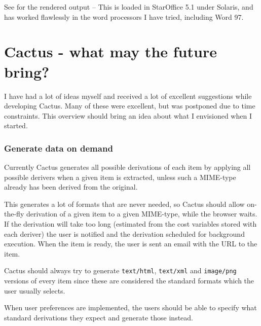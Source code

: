 

See  for the rendered output -- This is loaded in
  StarOffice 5.1 under Solaris, and has worked flawlessly in the word
  processors I have tried, including Word 97.






















\chapter{Cactus - what may the future bring?}

I have had a lot of ideas myself and received a lot of excellent
suggestions while developing Cactus.  Many of these were excellent,
but was postponed due to time constraints.  This overview should bring
an idea about what I envisioned when I started.

\subsection*{Generate data on demand}

Currently Cactus generates all possible derivations of each item by
applying all possible derivers when a given item is extracted, unless
such a MIME-type already has been derived from the original.

This generates a lot of formats that are never needed, so Cactus
should allow on-the-fly derivation of a given item to a given
MIME-type, while the browser waits.  If the derivation will take too
long (estimated from the cost variables stored with each deriver) the
user is notified and the derivation scheduled for background
execution.  When the item is ready, the user is sent an email with the
URL to the item.

Cactus should always try to generate \texttt{text/html},
\texttt{text/xml} and \texttt{image/png} versions of every item since
these are considered the standard formats which the user usually
selects.

When user preferences are implemented, the users should be able to
specify what standard derivations they expect and generate those
instead.

